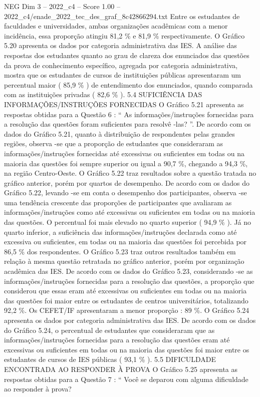 \begin{textsample}{NEG Dim 3 – 2022\_c4 – Score 1.00 – 2022\_c4/enade\_2022\_tec\_des\_graf\_8c42866294.txt}
Entre os estudantes de faculdades e universidades, ambas organizações acadêmicas com a menor incidência, essa proporção atingiu 81,2 \% e 81,9 \% respectivamente.
O Gráfico 5.20 apresenta os dados por categoria administrativa das IES.
A análise das respostas dos estudantes quanto ao grau de clareza dos enunciados das questões da prova de conhecimento específico, agregada por categoria administrativa, mostra que os estudantes de cursos de instituições públicas apresentaram um percentual maior ( 85,9 \% ) de entendimento dos enunciados, quando comparada com as instituições privadas ( 82,6 \% ). 5.4 SUFICIÊNCIA DAS INFORMAÇÕES/INSTRUÇÕES FORNECIDAS O Gráfico 5.21 apresenta as respostas obtidas para a Questão 6 : “ As informações/instruções fornecidas para a resolução das questões foram suficientes para resolvê -las? ”.
De acordo com os dados do Gráfico 5.21, quanto à distribuição de respondentes pelas grandes regiões, observa -se que a proporção de estudantes que consideraram as informações/instruções fornecidas até excessivas ou suficientes em todas ou na maioria das questões foi sempre superior ou igual a 90,7 \%, chegando a 94,3 \%, na região Centro-Oeste.
O Gráfico 5.22 traz resultados sobre a questão tratada no gráfico anterior, porém por quartos de desempenho.
De acordo com os dados do Gráfico 5.22, levando -se em conta o desempenho dos participantes, observa -se uma tendência crescente das proporções de participantes que avaliaram as informações/instruções como até excessivas ou suficientes em todas ou na maioria das questões.
O percentual foi mais elevado no quarto superior ( 94,9 \% ).
Já no quarto inferior, a suficiência das informações/instruções declarada como até excessiva ou suficientes, em todas ou na maioria das questões foi percebida por 86,5 \% dos respondentes.
O Gráfico 5.23 traz outros resultados também em relação à mesma questão retratada no gráfico anterior, porém por organização acadêmica das IES.
De acordo com os dados do Gráfico 5.23, considerando -se as informações/instruções fornecidas para a resolução das questões, a proporção que considerou que essas eram até excessivas ou suficientes em todas ou na maioria das questões foi maior entre os estudantes de centros universitários, totalizando 92,2 \%.
Os CEFET/IF apresentaram a menor proporção : 89 \%.
O Gráfico 5.24 apresenta os dados por categoria administrativa das IES.
De acordo com os dados do Gráfico 5.24, o percentual de estudantes que consideraram que as informações/instruções fornecidas para a resolução das questões eram até excessivas ou suficientes em todas ou na maioria das questões foi maior entre os estudantes de cursos de IES públicas ( 93,1 \% ). 5.5 DIFICULDADE ENCONTRADA AO RESPONDER À PROVA O Gráfico 5.25 apresenta as respostas obtidas para a Questão 7 : “ Você se deparou com alguma dificuldade ao responder à prova?

\end{textsample}
